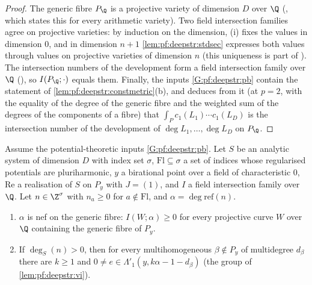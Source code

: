 \begin{proof}
The generic fibre $P_\Q$ is a projective variety of dimension $D$ over $\Q$
(, which states this for every
arithmetic variety). Two field intersection families agree on projective varieties: by induction on the
dimension, (i) fixes the values in dimension $0$, and in dimension $n+1$ \cref{lem:pf:deepstr:stdsec} expresses both
values through values on projective varieties of dimension $n$ (this uniqueness is part of
). The intersection numbers of the development
form a field intersection family over $\Q$
(), so $I(P_\Q;\cdot)$ equals them.
Finally, the inputs \ref{G:pf:deepstr:pb} contain the statement of \cref{lem:pf:deepstr:constmetric}(b), and
 deduces from it (at $p=2$, with the equality of
the degree of the generic fibre and the weighted sum of the degrees of the components of a fibre) that
$\int_Pc_1(L_1)\cdots c_1(L_D)$ is the intersection number of the development of $\deg L_1,\dots,\deg L_D$ on $P_\Q$.
\end{proof}

\begin{theorem}\label{thm:pf:deepstr:nefpol}
Assume the potential-theoretic inputs \ref{G:pf:deepstr:pb}. Let $S$ be an analytic system of dimension $D$ with
index set $\sigma$, $\mathrm{Fl}\subseteq\sigma$ a set of indices whose regularised potentials are pluriharmonic, $y$ a
birational point over a field of characteristic $0$, $\mathrm{Re}$ a realisation of $S$ on $P_y$ with $J=(1)$, and $I$
a field intersection family over $\Q$. Let $n\in\Z^\sigma$ with $n_a\ge0$ for $a\notin\mathrm{Fl}$, and $\alpha=\deg\mathrm{ref}(n)$.
\begin{enumerate}[label=(\alph*)]
\item $\alpha$ is nef on the generic fibre: $I(W;\alpha)\ge0$ for every projective curve $W$ over $\Q$ containing the
generic fibre of $P_y$.
\item If $\deg_S(n)>0$, then for every multihomogeneous $\beta\notin P_y$ of multidegree $d_\beta$ there are $k\ge1$ and
$0\ne e\in\Lambda'_1(y,k\alpha-1-d_\beta)$ (the group of \cref{lem:pf:deepstr:vi}).
\end{enumerate}
\end{theorem}

